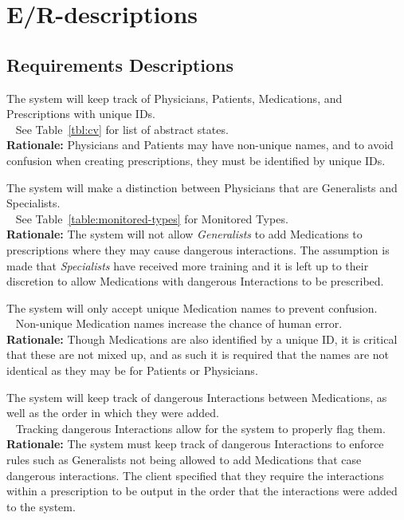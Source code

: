\section{E/R-descriptions}

\subsection{Requirements Descriptions}
{The system will keep track of Physicians, Patients, Medications, and Prescriptions with unique IDs.\\~}
{ See Table~\ref{tbl:cv} for list of abstract states.\\}
\label{R1}
\textbf{Rationale:} Physicians and Patients may have non-unique names, and to avoid confusion when creating prescriptions, they must be identified by unique IDs. 

{The system will make a distinction between Physicians that are Generalists and Specialists.\\~}
{ See Table~\ref{table:monitored-types} for Monitored Types.\\}
\label{R2}
\textbf{Rationale:} The system will not allow \textit{Generalists} to add Medications to prescriptions where they may cause dangerous interactions. The assumption is made that \textit{Specialists} have received more training and it is left up to their discretion to allow Medications with dangerous Interactions to be prescribed.

{The system will only accept unique Medication names to prevent confusion.\\~}
{ Non-unique Medication names increase the chance of human error. \\}
\label{R3}
\textbf{Rationale:} Though Medications are also identified by a unique ID, it is critical that these are not mixed up, and as such it is required that the names are not identical as they may be for Patients or Physicians.

{The system will keep track of dangerous Interactions between Medications, as well as the order in which they were added.\\~}
{ Tracking dangerous Interactions allow for the system to properly flag them. \\}
\label{R4}
\textbf{Rationale:} The system must keep track of dangerous Interactions to enforce rules such as Generalists not being allowed to add Medications that case dangerous interactions. The client specified that they require the interactions within a prescription to be output in the order that the interactions were added to the system.

